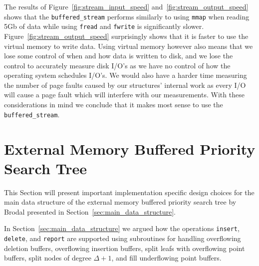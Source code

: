 \documentclass[twoside,11pt,openright]{report}
\newtheorem{lemma}{Lemma}
\begin{document}
The results of Figure~\ref{fig:stream_input_speed} and~\ref{fig:stream_output_speed} shows that the \texttt{buffered\_stream} performs similarly to using \texttt{mmap} when reading 5Gb of data while using \texttt{fread} and \texttt{fwrite} is significantly slower.
Figure~\ref{fig:stream_output_speed} surprisingly shows that it is faster to use the virtual memory to write data. Using virtual memory however also means that we lose some control of when and how data is written to disk, and we lose the control to accurately measure disk I/O's as we have no control of how the operating system schedules I/O's. We would also have a harder time measuring the number of page faults caused by our structures' internal work as every I/O will cause a page fault which will interfere with our measurements. With these considerations in mind we conclude that it makes most sense to use the \texttt{buffered\_stream}.




\section{External Memory Buffered Priority Search Tree}
\label{sec:impl_main_data_structure}
This Section will present important implementation specific design choices for the main data structure of the external memory buffered priority search tree by Brodal presented in Section~\ref{sec:main_data_structure}.

In Section~\ref{sec:main_data_structure} we argued how the operations \texttt{insert}, \texttt{delete}, and \texttt{report} are supported using subroutines for handling overflowing deletion buffers, overflowing insertion buffers, split leafs with overflowing point buffers, split nodes of degree $\Delta+1$, and fill underflowing point buffers.
\end{document}
